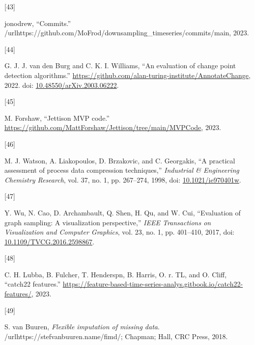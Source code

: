 \documentclass{article}
\newlength{\cslhangindent}
\newlength{\csllabelwidth}
\newlength{\cslentryspacingunit} %
\newenvironment{CSLReferences}[2] %
 {%
  \setlength{\parindent}{0pt}
  \ifodd #1
  \let\oldpar\par
  \def\par{\hangindent=\cslhangindent\oldpar}
  \fi
  \setlength{\parskip}{#2\cslentryspacingunit}
 }%
 {}
\newcommand{\CSLLeftMargin}[1]{\parbox[t]{\csllabelwidth}{#1}}
\newcommand{\CSLRightInline}[1]{\parbox[t]{\linewidth - \csllabelwidth}{#1}\break}
\begin{document}
\begin{CSLReferences}{0}{0}
\leavevmode{}%
\CSLLeftMargin{{[}43{]} }
\CSLRightInline{jonodrew, {``Commits.''}
/url{https://github.com/MoFrod/downsampling\_timeseries/commits/main},
2023.}

\leavevmode{}%
\CSLLeftMargin{{[}44{]} }
\CSLRightInline{G. J. J. van den Burg and C. K. I. Williams, {``An
evaluation of change point detection algorithms.''}
\url{https://github.com/alan-turing-institute/AnnotateChange}, 2022.
doi:
\href{https://doi.org/10.48550/arXiv.2003.06222}{10.48550/arXiv.2003.06222}.}

\leavevmode{}%
\CSLLeftMargin{{[}45{]} }
\CSLRightInline{M. Forshaw, {``Jettison MVP code.''}
\url{https://github.com/MattForshaw/Jettison/tree/main/MVPCode}, 2023.}

\leavevmode{}%
\CSLLeftMargin{{[}46{]} }
\CSLRightInline{M. J. Watson, A. Liakopoulos, D. Brzakovic, and C.
Georgakis, {``A practical assessment of process data compression
techniques,''} \emph{Industrial \& Engineering Chemistry Research}, vol.
37, no. 1, pp. 267--274, 1998, doi:
\href{https://doi.org/10.1021/ie970401w}{10.1021/ie970401w}.}

\leavevmode{}%
\CSLLeftMargin{{[}47{]} }
\CSLRightInline{Y. Wu, N. Cao, D. Archambault, Q. Shen, H. Qu, and W.
Cui, {``Evaluation of graph sampling: A visualization perspective,''}
\emph{IEEE Transactions on Visualization and Computer Graphics}, vol.
23, no. 1, pp. 401--410, 2017, doi:
\href{https://doi.org/10.1109/TVCG.2016.2598867}{10.1109/TVCG.2016.2598867}.}

\leavevmode{}%
\CSLLeftMargin{{[}48{]} }
\CSLRightInline{C. H. Lubba, B. Fulcher, T. Henderspn, B. Harris, O. r.
TL, and O. Cliff, {``catch22 features.''}
\url{https://feature-based-time-series-analys.gitbook.io/catch22-features/},
2023.}

\leavevmode{}%
\CSLLeftMargin{{[}49{]} }
\CSLRightInline{S. van Buuren, \emph{Flexible imputation of missing
data}. /url{https://stefvanbuuren.name/fimd/}; Chapman; Hall, CRC Press,
2018.}

\end{CSLReferences}



\end{document}
